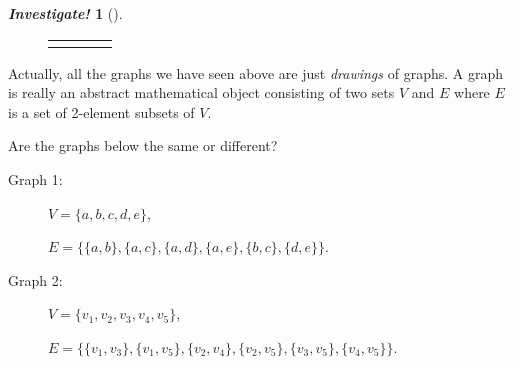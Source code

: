\documentclass[10pt,]{book}
\theoremstyle{plain}
\theoremstyle{definition}
\theoremstyle{definition}
\newtheorem{investigation}[project]{\emph{Investigate!}}
\theoremstyle{definition}
\numberwithin{equation}{chapter}
\newlength{\panelmax}
\newcommand{\vtx}[2]{node[fill,circle,inner sep=0pt, minimum size=4pt,label=#1:#2]{}}
\renewcommand{\v}{\vtx{above}{}}
\begin{document}
\begin{investigation}[]
{{{{
}
}}
\newlength{\phBNimage}\setlength{\phBNimage}{\ht\panelboxBNimage+\dp\panelboxBNimage}
\settototalheight{\phBNimage}{\usebox{\panelboxBNimage}}
\setlength{\panelmax}{\maxof{\panelmax}{\phBNimage}}
\leavevmode%
\setlength{\tabcolsep}{0\textwidth}
\begin{figure}
\begin{tabular}{@{}*{4}{c}@{}}
\begin{minipage}[c][\panelmax][t]{0.25\textwidth}\usebox{\panelboxBKimage}\end{minipage}&
\begin{minipage}[c][\panelmax][t]{0.25\textwidth}\usebox{\panelboxBLimage}\end{minipage}&
\begin{minipage}[c][\panelmax][t]{0.25\textwidth}\usebox{\panelboxBMimage}\end{minipage}&
\begin{minipage}[c][\panelmax][t]{0.25\textwidth}\usebox{\panelboxBNimage}\end{minipage}\end{tabular}
\end{figure}
}%
\par

Actually, all the graphs we have seen above are just \emph{drawings} of graphs. A graph is really an abstract mathematical object consisting of two sets \(V\) and \(E\) where \(E\) is a set of 2-element subsets of \(V\).
%
\par

Are the graphs below the same or different?
%
\leavevmode%
\begin{description}
\item[Graph 1:]\hypertarget{li-1196}{}\(V = \{a, b, c, d, e\}\),%
\par
 \(E = \{\{a,b\}, \{a, c\}, \{a,d\}, \{a,e\}, \{b,c\}, \{d,e\}\}\).%
\item[Graph 2:]\hypertarget{li-1197}{}\(V = \{v_1, v_2, v_3, v_4, v_5\}\),%
\par
 \(E = \{\{v_1, v_3\}, \{v_1, v_5\}, \{v_2, v_4\}, \{v_2, v_5\}, \{v_3, v_5\}, \{v_4, v_5\}\}\).%
\end{description}
\end{investigation}
\end{document}
